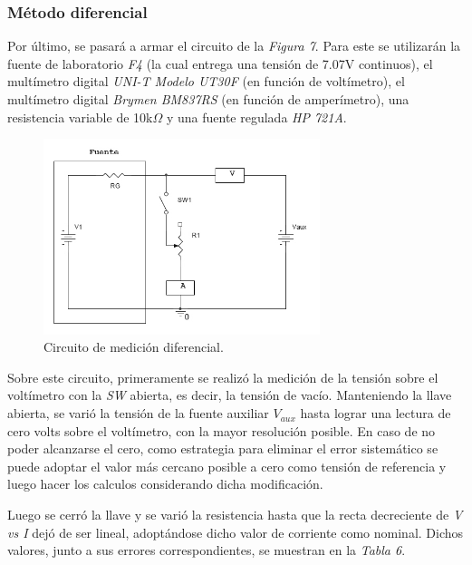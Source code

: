 \documentclass{article}
\begin{document}
 


\subsubsection{Método diferencial}

	Por último, se pasará a armar el circuito de la \textit{Figura 7}. Para este se utilizarán la fuente de laboratorio \textit{F4} (la cual entrega una tensión de 7.07V continuos), el multímetro digital \textit{UNI-T Modelo UT30F} (en función de voltímetro), el multímetro digital \textit{Brymen BM837RS} (en función de amperímetro), una resistencia variable de 10k$\Omega$ y una fuente regulada \textit{HP 721A}.
\bigskip



\newpage

\begin{figure}[h]
	\centering
	\includegraphics[width=0.72\textwidth]{images/p3-item-g.jpg}
	\caption{Circuito de medición diferencial.}
\end{figure}
\bigskip\bigskip



\noindent Sobre este circuito, primeramente se realizó la medición de la tensión sobre el voltímetro con la \textit{SW} abierta, es decir, la tensión de vacío. Manteniendo la llave abierta, se varió la tensión de la fuente auxiliar \textit{$V_{aux}$} hasta lograr una lectura de cero volts sobre el voltímetro, con la mayor resolución posible. En caso de no poder alcanzarse el cero, como estrategia para eliminar el error sistemático se puede adoptar el valor más cercano posible a cero como tensión de referencia y luego hacer los calculos considerando dicha modificación. 
	\par
	Luego se cerró la llave y se varió la resistencia hasta que la recta decreciente de \textit{V vs I} dejó de ser lineal, adoptándose dicho valor de corriente como nominal. Dichos valores, junto a sus errores correspondientes, se muestran en la \textit{Tabla 6}.
\bigskip\bigskip\bigskip
\end{document}
